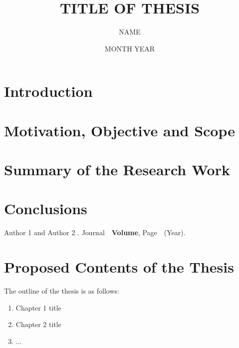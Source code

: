 \documentclass[MTech,synopsis]{iitmdiss}
\title{TITLE OF THESIS}
\author{NAME}
\date{MONTH YEAR}
\begin{document}
\maketitle



\setcounter{page}{0}
\section{Introduction}

\section{Motivation, Objective and Scope}

\section{Summary of the Research Work}

\section{Conclusions}



\begin{singlespace}
\begin{thebibliography}{10}

Author 1 and Author 2
.
\newblock Journal\ \ {\bf Volume}, Page\ \ (Year).
\end{thebibliography}

\end{singlespace}




\section{Proposed Contents of the Thesis}
The outline of the thesis is as follows:
\begin{enumerate}
\item Chapter 1 title
\item Chapter 2 title
\item ...
\end{enumerate}
\end{document}

